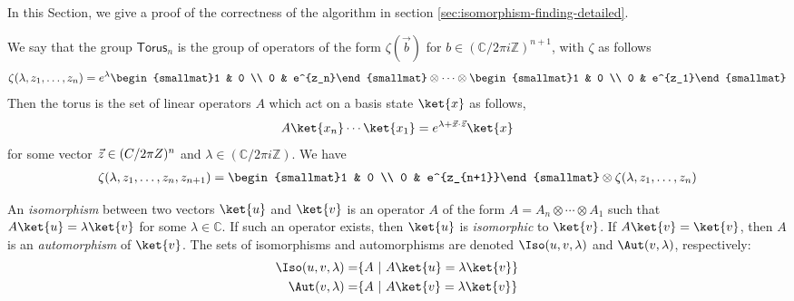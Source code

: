 \label{sec:isomorphism-finding-correctness}

In this Section, we give a proof of the correctness of the algorithm in section \autoref{sec:isomorphism-finding-detailed}.

We say that the group $\textsf{Torus}_n$ is the group of operators of the form $\zeta(\vec{b})$ for $b\in (\mathbb C/2\pi i\mathbb Z)^{n+1}$, with $\zeta$ as follows
\begin{align}
	\zeta(\lambda,z_1,\ldots, z_n) = e^\lambda\begin{smallmat}1 & 0 \\ 0 & e^{z_n}\end{smallmat}\otimes\cdots\otimes \begin{smallmat}1 & 0 \\ 0 & e^{z_1}\end{smallmat}
\end{align}
Then the torus is the set of linear operators $A$ which act on a basis state $\ket{x}$ as follows,
\begin{align}
	A\ket{x_n}\cdots\ket{x_1} = e^{\lambda+\vec x\cdot \vec z}\ket{x}
\end{align}
for some vector $\vec z\in \mathbb (C/2\pi \mathbb \mathbb Z)^{n}$ and $\lambda\in (\mathbb C/2\pi i\mathbb Z)$.
We have
\begin{align}
	\zeta(\lambda, z_1,\ldots, z_n, z_{n+1})=\begin{smallmat}1 & 0 \\ 0 & e^{z_{n+1}}\end{smallmat}\otimes \zeta(\lambda, z_1,\ldots, z_n)
\end{align}
\begin{definition}
	An \emph{isomorphism} between two vectors $\ket{u}$ and $\ket{v}$ is an operator $A$ of the form $A=A_n\otimes\cdots\otimes A_1$ such that $A\ket{u}=\lambda\ket{v}$ for some $\lambda\in\mathbb C$.
	If such an operator exists, then $\ket{u}$ is \emph{isomorphic} to $\ket{v}$.
	If $A\ket{v}=\ket{v}$, then $A$ is an \emph{automorphism} of $\ket{v}$.
	The sets of isomorphisms and automorphisms are denoted $\Iso(u,v,\lambda)$ and $\Aut(v,\lambda)$, respectively:
	\begin{align}
		\Iso(u,v,\lambda) = & \{A\ |\ A\ket{u}=\lambda\ket{v}\} \\
		\Aut(v,\lambda) = & \{A\ |\ A\ket{v}=\lambda\ket{v}\}
	\end{align}
\end{definition}
